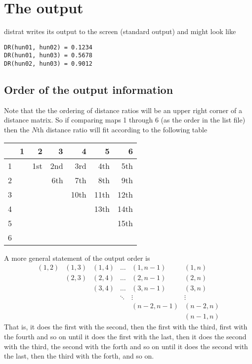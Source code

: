 \documentclass[%
	11pt,
        a4paper,
        twoside]{workrep}
\newcommand*{\prg}[1]{\textsf{#1}}		%
\begin{document}
\section{The output}\label{sec:drout}

\prg{distrat} writes its output to the screen (standard output) and
might look like
\begin{verbatim}
DR(hun01, hun02) = 0.1234
DR(hun01, hun03) = 0.5678
DR(hun02, hun03) = 0.9012
\end{verbatim}

\subsection{Order of the output information}

Note that the the ordering of distance ratios will be an upper right
corner of a distance matrix.  So if comparing maps 1 through 6 (as
the order in the list file) then the $N$th distance ratio will fit
according to the following table

\begin{center}
\begin{tabular}{l|rrrrrr}
  &   1 &   2 &   3 &    4 &    5 &    6\\
\hline
1 &     & 1st & 2nd &  3rd &  4th & 5th\\
2 &     &     & 6th &  7th &  8th & 9th\\
3 &     &     &     & 10th & 11th & 12th\\
4 &     &     &     &      & 13th & 14th\\
5 &     &     &     &      &      & 15th\\
6 &     &     &     &      &      &
\end{tabular}
\end{center}

A more general statement of the output order is
\[
\begin{array}{cccccc}
(1, 2)& (1, 3) & (1, 4) & \ldots & (1,n-1)    &  (1, n)\\
      & (2, 3) & (2, 4) & \ldots & (2,n-1)    &  (2, n)\\
      &        & (3, 4) & \ldots & (3,n-1)    &  (3, n)\\
      &        &        & \ddots & \vdots     & \vdots\\
      &        &        &        & (n-2, n-1) & (n-2, n)\\
      &        &        &        &            & (n-1, n)
\end{array}
\]
That is, it does the first with the second, then the first with the third,
first with the fourth and so on until it does the first with the last, then
it does the second with the third, the second with the forth and so on
until it does the second with the last, then the third with the forth, and
so on.
\end{document}
